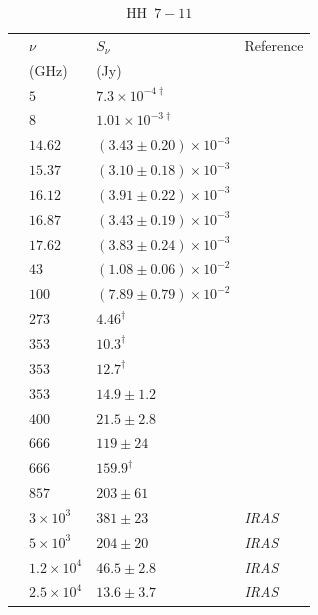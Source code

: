 \documentclass[9pt]{extarticle}   	%
\begin{document}
\begin{table}
\caption{HH~$7-11$}
\begin{center}
\begin{tabular}{llll}
\hline
 & $\nu$ & $S_\nu$ & Reference\\
 & (GHz) & (Jy) & \\
\hline
 & $5$ & $7.3\times10^{-4\dag}$ & \citet{1999ApJS..125..427R}\\
 & $8$ & $1.01\times10^{-3\dag}$ & \citet{1999ApJS..125..427R}\\
 & $14.62$ & $(3.43\pm0.20)\times10^{-3}$ & \citet{2012MNRAS.423.1089A}\\
 & $15.37$ & $(3.10\pm0.18)\times10^{-3}$ & \citet{2012MNRAS.423.1089A}\\
 & $16.12$ & $(3.91\pm0.22)\times10^{-3}$ & \citet{2012MNRAS.423.1089A}\\
 & $16.87$ & $(3.43\pm0.19)\times10^{-3}$ & \citet{2012MNRAS.423.1089A}\\
 & $17.62$ & $(3.83\pm0.24)\times10^{-3}$ & \citet{2012MNRAS.423.1089A}\\
 & $43$ & $(1.08\pm0.06)\times10^{-2}$ & \citet{2004ApJ...605L.137A}\\
 & $100$ & $(7.89\pm0.79)\times10^{-2}$ & \citet{2009ApJ...691.1729C}\\
 & $273$ & $4.46^{\dag}$ & \citet{2006ApJ...638..293E}\\
 & $353$ & $10.3^{\dag}$ & \citet{2008ApJS..175..277D}\\
 & $353$ & $12.7^{\dag}$ & \citet{2007AA...468.1009H}\\
 & $353$ & $14.9\pm1.2$ & \citet{2000ApJ...530..851C}\\
 & $400$ & $21.5\pm2.8$ & \citet{2000ApJ...530..851C}\\
 & $666$ & $119\pm24$ & \citet{2000ApJ...530..851C}\\
 & $666$ & $159.9^{\dag}$ & \citet{2007AA...468.1009H}\\
 & $857$ & $203\pm61$ & \citet{2000ApJ...530..851C}\\
 & $3\times10^{3}$ & $381\pm23$ & \textit{IRAS}\\
 & $5\times10^{3}$ & $204\pm20$ & \textit{IRAS}\\
 & $1.2\times10^{4}$ & $46.5\pm2.8$ & \textit{IRAS}\\
 & $2.5\times10^{4}$ & $13.6\pm3.7$ & \textit{IRAS}\\
\end{tabular}
\end{center}
\label{default}
\end{table}%
\end{document}
